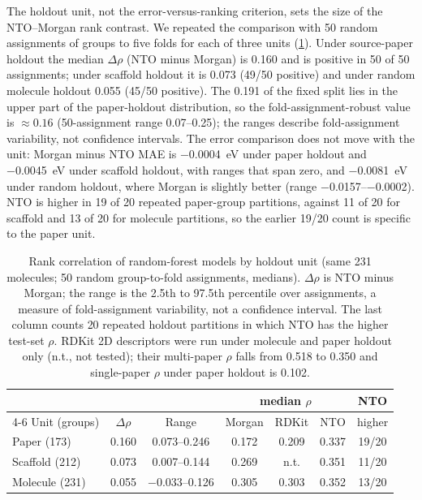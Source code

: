 The holdout unit, not the error-versus-ranking criterion, sets the size of the NTO--Morgan rank
contrast. We repeated the comparison with \num{50} random assignments of groups to five folds for
each of three units (\cref{tab:holdout_unit}). Under source-paper holdout the median
$\Delta\rho$ (NTO minus Morgan) is \num{0.160} and is positive in \num{50} of \num{50} assignments;
under scaffold holdout it is \num{0.073} (\num{49}/\num{50} positive) and under random
molecule holdout \num{0.055} (\num{45}/\num{50} positive). The \num{0.191} of the fixed
split lies in the upper part of the paper-holdout distribution, so the fold-assignment-robust
value is $\approx\num{0.16}$ (\num{50}-assignment range \numrange{0.07}{0.25}); the ranges
describe fold-assignment variability, not confidence intervals. The error comparison does not move
with the unit: Morgan minus NTO MAE is \qty{-0.0004}{\electronvolt} under paper holdout and
\qty{-0.0045}{\electronvolt} under scaffold holdout, with ranges that span zero, and
\qty{-0.0081}{\electronvolt} under random holdout, where Morgan is slightly better
(range \numrange{-0.0157}{-0.0002}). NTO is higher in \num{19} of \num{20} repeated
paper-group partitions, against \num{11} of \num{20} for scaffold and \num{13} of \num{20}
for molecule partitions, so the earlier \num{19}/\num{20} count is specific to the paper unit.

\begin{table}[htbp]
  \centering
  \caption{Rank correlation of random-forest models by holdout unit (same \num{231}
    molecules; \num{50} random group-to-fold assignments, medians). $\Delta\rho$ is NTO minus Morgan;
    the range is the 2.5th to 97.5th percentile over assignments, a measure of
    fold-assignment variability, not a confidence interval. The last column counts
    \num{20} repeated holdout partitions in which NTO has the higher test-set $\rho$.
    RDKit 2D descriptors were run under molecule and paper holdout only (n.t., not tested);
    their multi-paper $\rho$ falls from \num{0.518} to \num{0.350} and single-paper $\rho$ under
    paper holdout is \num{0.102}.}
  \label{tab:holdout_unit}
  \footnotesize\setlength{\tabcolsep}{1.5pt}
  \begin{tabular}{lcccccc}
    \toprule
    & & & \multicolumn{3}{c}{median $\rho$} & NTO \\
    \cmidrule(lr){4-6}
    Unit (groups) & $\Delta\rho$ & Range & Morgan & RDKit & NTO & higher \\
    \midrule
    Paper (\num{173})    & 0.160 & 0.073--0.246 & 0.172 & 0.209 & 0.337 & 19/20 \\
    Scaffold (\num{212}) & 0.073 & 0.007--0.144 & 0.269 & n.t. & 0.351 & 11/20 \\
    Molecule (\num{231}) & 0.055 & $-0.033$--0.126 & 0.305 & 0.303 & 0.352 & 13/20 \\
    \bottomrule
  \end{tabular}
\end{table}

